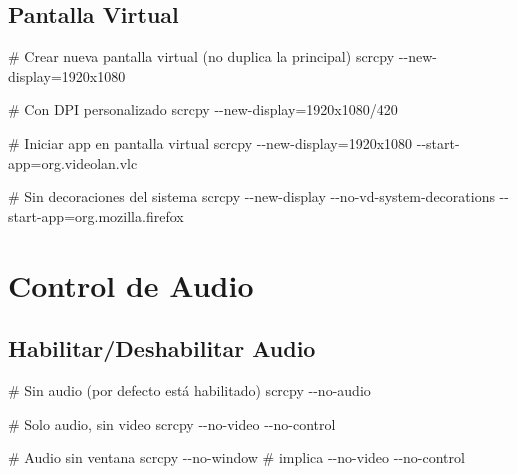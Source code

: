 \documentclass[
  doc,
  floatsintext,
  longtable,
  a4paper,
  nolmodern,
  notxfonts,
  notimes,
  12pt,
  colorlinks=true,linkcolor=blue,citecolor=blue,urlcolor=blue]{apa7}
\newenvironment{Shaded}{\begin{snugshade}}{\end{snugshade}}
\newcommand{\AttributeTok}[1]{\textcolor[rgb]{0.40,0.45,0.13}{#1}}
\newcommand{\CommentTok}[1]{\textcolor[rgb]{0.37,0.37,0.37}{#1}}
\newcommand{\ExtensionTok}[1]{\textcolor[rgb]{0.00,0.23,0.31}{#1}}
\newcommand{\NormalTok}[1]{\textcolor[rgb]{0.00,0.23,0.31}{#1}}
\newcommand{\OperatorTok}[1]{\textcolor[rgb]{0.37,0.37,0.37}{#1}}
\begin{document}
\subsection{Pantalla Virtual}\label{pantalla-virtual}

\begin{Shaded}
\begin{Highlighting}[]
\CommentTok{\# Crear nueva pantalla virtual (no duplica la principal)}
\ExtensionTok{scrcpy} \AttributeTok{{-}{-}new{-}display}\OperatorTok{=}\NormalTok{1920x1080}

\CommentTok{\# Con DPI personalizado}
\ExtensionTok{scrcpy} \AttributeTok{{-}{-}new{-}display}\OperatorTok{=}\NormalTok{1920x1080/420}

\CommentTok{\# Iniciar app en pantalla virtual}
\ExtensionTok{scrcpy} \AttributeTok{{-}{-}new{-}display}\OperatorTok{=}\NormalTok{1920x1080 }\AttributeTok{{-}{-}start{-}app}\OperatorTok{=}\NormalTok{org.videolan.vlc}

\CommentTok{\# Sin decoraciones del sistema}
\ExtensionTok{scrcpy} \AttributeTok{{-}{-}new{-}display} \AttributeTok{{-}{-}no{-}vd{-}system{-}decorations} \AttributeTok{{-}{-}start{-}app}\OperatorTok{=}\NormalTok{org.mozilla.firefox}
\end{Highlighting}
\end{Shaded}

\section{Control de Audio}\label{control-de-audio}

\subsection{Habilitar/Deshabilitar
Audio}\label{habilitardeshabilitar-audio}

\begin{Shaded}
\begin{Highlighting}[]
\CommentTok{\# Sin audio (por defecto está habilitado)}
\ExtensionTok{scrcpy} \AttributeTok{{-}{-}no{-}audio}

\CommentTok{\# Solo audio, sin video}
\ExtensionTok{scrcpy} \AttributeTok{{-}{-}no{-}video} \AttributeTok{{-}{-}no{-}control}

\CommentTok{\# Audio sin ventana}
\ExtensionTok{scrcpy} \AttributeTok{{-}{-}no{-}window}  \CommentTok{\# implica {-}{-}no{-}video {-}{-}no{-}control}
\end{Highlighting}
\end{Shaded}
\end{document}
